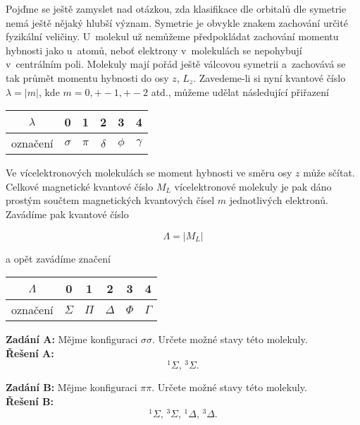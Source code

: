 Pojďme se ještě zamyslet nad otázkou, zda klasifikace dle orbitalů dle symetrie nemá ještě nějaký hlubší význam. Symetrie je obvykle znakem zachování určité fyzikální veličiny. U~molekul už nemůžeme předpokládat zachování momentu hybnosti jako u~atomů, neboť elektrony v~molekulách se nepohybují v~centrálním poli. Molekuly mají pořád ještě válcovou symetrii a~zachovává se tak průmět momentu hybnosti do osy $z$, $L_z$. Zavedeme-li si nyní kvantové číslo $\lambda= |m|$, kde $m=0,+-1,+-2$ atd., můžeme udělat následující přiřazení


\begin{table} [htb]
\centering
\begin{tabular}{c|c|c|c|c|c}
\toprule
$\lambda$ & 0 & 1 & 2 & 3 & 4\\
\midrule
označení & $\sigma$ & $\pi$ & $\delta$ & $\phi$ & $\gamma$\\
\bottomrule
\end{tabular}
\end{table}


Ve vícelektronových molekulách se moment hybnosti ve směru osy $z$ může sčítat. Celkové magnetické kvantové číslo $M_L$ vícelektronové molekuly je pak dáno prostým součtem magnetických kvantových čísel $m$ jednotlivých elektronů. Zavádíme pak kvantové číslo 

\begin{equation}
\Lambda = \vert M_L \vert
\label{rov:ElStrukt-24}
\end{equation}   
      
\noindent a opět zavádíme značení


\begin{table} [H]
\centering
\begin{tabular}{c|c|c|c|c|c}
\toprule
$\Lambda$ & 0 & 1 & 2 & 3 & 4\\
\midrule
označení & $\Sigma$ & $\Pi$ & $\Delta$ & $\Phi$ & $\Gamma$\\
\bottomrule
\end{tabular}
\end{table}

\begin{priklad}
\textbf{Zadání A:} Mějme konfiguraci $\sigma\sigma$. Určete možné stavy této molekuly.\\[0.1cm]
\textbf{Řešení A:} 
\begin{displaymath}
^{1}\Sigma, \, ^{3}\Sigma.
\end{displaymath}

\textbf{Zadání B:} Mějme konfiguraci $\pi\pi$. Určete možné stavy této molekuly.\\[0.1cm]
\textbf{Řešení B:}
\begin{displaymath}
^{1}\Sigma, \, ^{3}\Sigma, \, ^{1}\Delta, \, ^{3}\Delta.
\end{displaymath} \vspace{-0.7cm}
\end{priklad}


